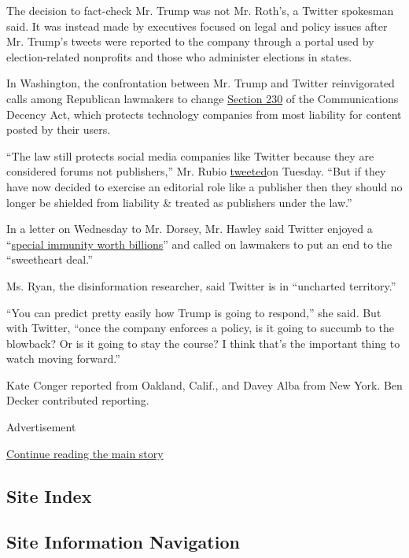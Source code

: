 The decision to fact-check Mr. Trump was not Mr. Roth's, a Twitter
spokesman said. It was instead made by executives focused on legal and
policy issues after Mr. Trump's tweets were reported to the company
through a portal used by election-related nonprofits and those who
administer elections in states.

In Washington, the confrontation between Mr. Trump and Twitter
reinvigorated calls among Republican lawmakers to change
\href{https://www.nytimes3xbfgragh.onion/2020/02/04/technology/section-230-lobby.html}{Section
230} of the Communications Decency Act, which protects technology
companies from most liability for content posted by their users.

``The law still protects social media companies like Twitter because
they are considered forums not publishers,'' Mr. Rubio
\href{https://twitter.com/marcorubio/status/1265442093641732096}{tweeted}on
Tuesday. ``But if they have now decided to exercise an editorial role
like a publisher then they should no longer be shielded from liability
\& treated as publishers under the law.''

In a letter on Wednesday to Mr. Dorsey, Mr. Hawley said Twitter enjoyed
a
``\href{https://twitter.com/HawleyMO/status/1265444047365312515}{special
immunity worth billions}'' and called on lawmakers to put an end to the
``sweetheart deal.''

Ms. Ryan, the disinformation researcher, said Twitter is in ``uncharted
territory.''

``You can predict pretty easily how Trump is going to respond,'' she
said. But with Twitter, ``once the company enforces a policy, is it
going to succumb to the blowback? Or is it going to stay the course? I
think that's the important thing to watch moving forward.''

Kate Conger reported from Oakland, Calif., and Davey Alba from New York.
Ben Decker contributed reporting.

Advertisement

\protect\hyperlink{after-bottom}{Continue reading the main story}

\hypertarget{site-index}{%
\subsection{Site Index}\label{site-index}}

\hypertarget{site-information-navigation}{%
\subsection{Site Information
Navigation}\label{site-information-navigation}}

